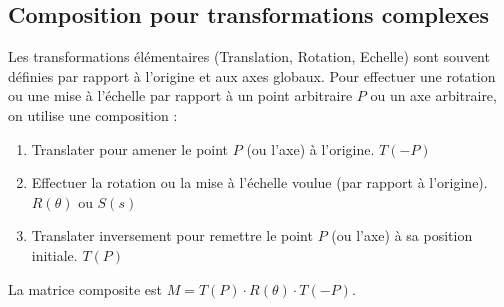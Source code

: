 \subsection{Composition pour transformations complexes}
Les transformations élémentaires (Translation, Rotation, Echelle) sont souvent définies par rapport à l'origine et aux axes globaux. Pour effectuer une rotation ou une mise à l'échelle par rapport à un point arbitraire \( P \) ou un axe arbitraire, on utilise une composition :
\begin{enumerate}
    \item Translater pour amener le point \( P \) (ou l'axe) à l'origine. \( T(-P) \)
    \item Effectuer la rotation ou la mise à l'échelle voulue (par rapport à l'origine). \( R(\theta) \) ou \( S(s) \)
    \item Translater inversement pour remettre le point \( P \) (ou l'axe) à sa position initiale. \( T(P) \)
\end{enumerate}
La matrice composite est \( M = T(P) \cdot R(\theta) \cdot T(-P) \).
